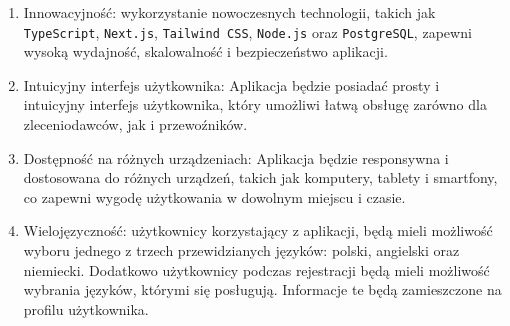 \begin{enumerate}
    \item Innowacyjność: wykorzystanie nowoczesnych technologii, takich jak \texttt{TypeScript}, \texttt{Next.js}, \texttt{Tailwind CSS}, \texttt{Node.js} oraz \texttt{PostgreSQL}, zapewni wysoką wydajność, skalowalność i bezpieczeństwo aplikacji.
    \item Intuicyjny interfejs użytkownika: Aplikacja będzie posiadać prosty i intuicyjny interfejs użytkownika, który umożliwi łatwą obsługę zarówno dla zleceniodawców, jak i przewoźników.
    \item Dostępność na różnych urządzeniach: Aplikacja będzie responsywna i dostosowana do różnych urządzeń, takich jak komputery, tablety i smartfony, co zapewni wygodę użytkowania w dowolnym miejscu i czasie.
    \item Wielojęzyczność: użytkownicy korzystający z aplikacji, będą mieli możliwość wyboru jednego z trzech przewidzianych języków: polski, angielski oraz niemiecki. Dodatkowo użytkownicy podczas rejestracji będą mieli możliwość wybrania języków, którymi się posługują. Informacje te będą zamieszczone na profilu użytkownika.
\end{enumerate}